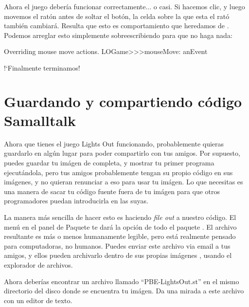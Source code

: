 \documentclass[a4paper,10pt,twoside]{book}
\begin{document}

Ahora el juego deber\'ia funcionar correctamente... o casi. Si hacemos clic, y luego movemos el rat\'on antes de soltar el bot\'on, la celda sobre la que esta el rat\'o tambi\'en cambiar\'a. Resulta que esto es comportamiento que heredamos de . Podemos arreglar esto simplemente sobreescribiendo  para que no haga nada:

\begin{method}[mouseMove:]{Overriding mouse move actions.}
LOGame>>>mouseMove: anEvent
\end{method}

!`Finalmente terminamos!

\section{Guardando y compartiendo c\'odigo Samalltalk}

Ahora que tienes el juego Lights Out funcionando, probablemente quieras guardarlo en alg\'un lugar para poder compartirlo con tus amigos. Por supuesto, puedes guardar tu im\'agen de \pharo completa, y mostrar tu primer programa ejecut\'andola, pero tus amigos probablemente tengan su propio c\'odigo en sus im\'agenes, y no quieran renunciar a eso para usar tu im\'agen. 
Lo que necesitas es una manera de sacar tu c\'odigo fuente fuera de tu im\'agen \pharo para que otros programadores puedan introducirla en las suyas. 

La manera m\'as sencilla de hacer esto es haciendo \emph{file out} a nuestro c\'odigo. El men\'u \actclick en el panel de Paquete te dar\'a la opci\'on  de todo el paquete .
El archivo resultante es m\'as o menos humanamente legible, pero est\'a realmente pensado para computadoras, no humanos. 
Puedes enviar este archivo via email a tus amigos, y ellos pueden archivarlo dentro de sus propias im\'agenes \pharo, usando el explorador de archivos.

Ahora deber\'ias encontrar un archivo llamado ``PBE-LightsOut.st'' en el mismo directorio del disco donde se encuentra tu im\'agen.
Da una mirada a este archivo con un editor de texto.
\end{document}
